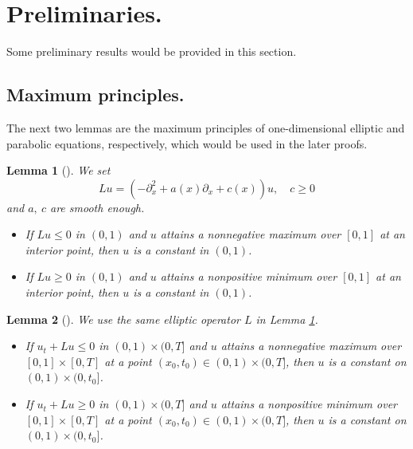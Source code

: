 \documentclass[11pt]{article}
\newtheorem{lemma}{Lemma}[section]
\numberwithin{equation}{section}
\begin{document}
\section{Preliminaries.}\label{section_pre}
Some preliminary results would be provided in this section. 
\subsection{Maximum principles.}
The next two lemmas are the maximum principles of one-dimensional elliptic and parabolic equations, respectively, which would be used in the later proofs. 
\begin{lemma}[\cite{Evans:1998}]\label{lemma_max_elliptic}
We set 
$$Lu=(-\partial_x^2+a(x)\partial_x+c(x))u, \quad c\ge 0$$ and $a,\ c$ are smooth enough.   
\begin{itemize}
 \item [(a)] If $Lu\le 0$ in $(0,1)$ and $u$ attains a nonnegative maximum over $[0,1]$ at an interior point, then $u$ is a constant in $(0,1)$.
 \item [(b)] If $Lu\ge 0$ in $(0,1)$ and $u$ attains a nonpositive minimum over $[0,1]$ at an interior point, then $u$ is a constant in $(0,1)$.
\end{itemize}
\end{lemma}



\begin{lemma}[\cite{Evans:1998}]\label{lemma_max_parabolic}
 We use the same elliptic operator $L$ in Lemma \ref{lemma_max_elliptic}. 
 \begin{itemize}
  \item [(a)] If $u_t+Lu\le 0$ in $(0,1)\times (0,T]$ and $u$ attains a nonnegative maximum over $[0,1]\times[0,T]$ at a point $(x_0,t_0)\in (0,1)\times(0,T]$, then 
  $u$ is a constant on $(0,1)\times(0,t_0]$.
  \item [(b)] If $u_t+Lu\ge 0$ in $(0,1)\times (0,T]$ and $u$ attains a nonpositive minimum over $[0,1]\times[0,T]$ at a point $(x_0,t_0)\in (0,1)\times(0,T]$, then 
  $u$ is a constant on $(0,1)\times(0,t_0]$.
 \end{itemize}
\end{lemma}
\end{document}

